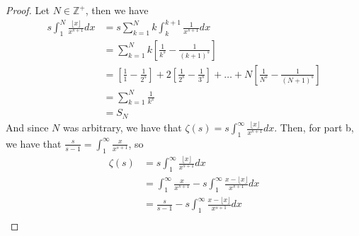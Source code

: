 \documentclass[hidelinks,12pt]{article}
\newcommand{\Z}{\mathbb{Z}}
\begin{document}
\begin{enumerate}
\begin{enumerate}[label=(\alph*).]
   \end{enumerate} 
   \begin{proof}
   Let \(N\in\Z^{+}\), then we have
   \begin{align*}
       s\int_{1}^{N}\frac{\lfloor x\rfloor}{x^{s+1}}dx&=s\sum_{k=1}^{N}k\int_{k}^{k+1}\frac{1}{x^{s+1}}dx\\
                                                      &=\sum_{k=1}^{N}k\left[\frac{1}{k^{s}}-\frac{1}{(k+1)^{s}}\right]\\
                                                      &=\left[\frac{1}{1}-\frac{1}{2^{s}}\right]+2\left[\frac{1}{2^{s}}-\frac{1}{3^{s}}\right]+\dots+N\left[\frac{1}{N^{s}}-\frac{1}{(N+1)^{s}}\right]\\
                                                      &=\sum_{k=1}^{N}\frac{1}{k^{s}}\\
                                                      &=S_{N}\tag{N-th partial sum}
   \end{align*}
   And since \(N\) was arbitrary, we have that \(\zeta(s)=s\int_{1}^{\infty}\frac{\lfloor x\rfloor}{x^{s+1}}dx\). Then, for part b, we have that \(\frac{s}{s-1}=\int_{1}^{\infty}\frac{x}{x^{s+1}}\), so \begin{align*}
       \zeta(s)&=s\int_{1}^{\infty}\frac{\lfloor x\rfloor}{x^{s+1}}dx\\
       &=\int_{1}^{\infty}\frac{x}{x^{s+1}}-s\int_{1}^{\infty}\frac{x-\lfloor x\rfloor}{x^{s+1}}dx\\
       &=\frac{s}{s-1}-s\int_{1}^{\infty}\frac{x-\lfloor x\rfloor}{x^{s+1}}dx\\
   \end{align*}
   \end{proof}
\end{enumerate}
\end{document}
